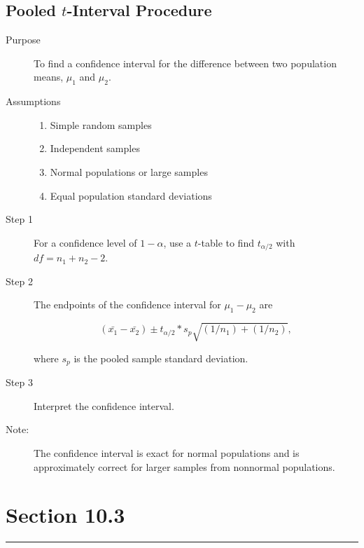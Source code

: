 \documentclass[12pt]{article}
\begin{document}
            \subsection*{Pooled $t$-Interval Procedure}
                \begin{description}
                    \item[Purpose] To find a confidence interval for the difference between
                    two population means, $\mu_1$ and $\mu_2$. 
                    \item[Assumptions]
                    \begin{enumerate}
                        \item Simple random samples
                        \item Independent samples
                        \item Normal populations or large samples
                        \item Equal population standard deviations
                    \end{enumerate}
                    \item[Step 1] For a confidence level of $1-\alpha$, use a $t$-table to
                    find $t_{\alpha/2}$ with $df = n_1 + n_2 - 2$.
                    \item[Step 2] The endpoints of the confidence interval for $\mu_1-\mu_2$
                    are
                    \begin{center}
                        \[
                            (\bar{x_1}-\bar{x_2}) \pm t_{\alpha/2}*s_p\sqrt{(1/n_1)+(1/n_2)},    
                        \]
                    \end{center}   
                    where $s_p$ is the pooled sample standard deviation.
                    \item[Step 3] Interpret the confidence interval.
                    \item[Note:] The confidence interval is exact for normal populations and
                    is approximately correct for larger samples from nonnormal populations.  
                \end{description}

    \section*{Section 10.3}
    \noindent\rule{\textwidth}{0.4pt}
\end{document}

